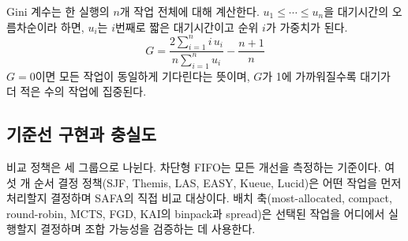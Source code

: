 \documentclass{ieeetj}
\begin{document}
Gini 계수는 한 실행의 $n$개 작업 전체에 대해 계산한다. $u_1\le\cdots\le u_n$을 대기시간의 오름차순이라 하면, $u_i$는 $i$번째로 짧은 대기시간이고 순위 $i$가 가중치가 된다.
\begin{equation}
G = \frac{2\sum_{i=1}^{n} i\,u_i}{n\sum_{i=1}^{n} u_i} - \frac{n+1}{n}
\label{eq:gini}
\end{equation}
$G=0$이면 모든 작업이 동일하게 기다린다는 뜻이며, $G$가 1에 가까워질수록 대기가 더 적은 수의 작업에 집중된다.

\subsection{기준선 구현과 충실도}\label{eval:impl}
비교 정책은 세 그룹으로 나뉜다. 차단형 FIFO는 모든 개선을 측정하는 기준이다. 여섯 개 순서 결정 정책(SJF, Themis, LAS, EASY, Kueue, Lucid)은 어떤 작업을 먼저 처리할지 결정하며 SAFA의 직접 비교 대상이다. 배치 축(most-allocated, compact, round-robin, MCTS, FGD, KAI의 binpack과 spread)은 선택된 작업을 어디에서 실행할지 결정하며 조합 가능성을 검증하는 데 사용한다.
\end{document}
